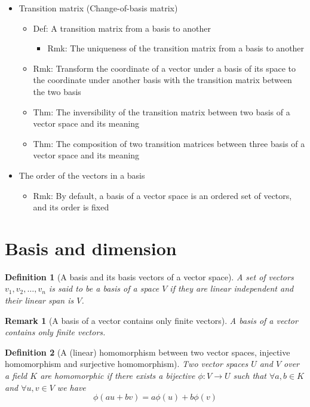 \documentclass[onecolumn]{ctexart}
\newtheorem{definition}{Definition}
\newtheorem{remark}{Remark}
\begin{document}
\begin{itemize}
\begin{itemize}
  \end{itemize}
  \item Transition matrix (Change-of-basis matrix)
  \begin{itemize}
    \item Def: A transition matrix from a basis to another
    \begin{itemize}
      \item Rmk: The uniqueness of the transition matrix from a basis to another
    \end{itemize}
    \item Rmk: Transform the coordinate of a vector under a basis of its space to the coordinate under another basis with the transition matrix between the two basis
    \item Thm: The inversibility of the transition matrix between two basis of a vector space and its meaning
    \item Thm: The composition of two transition matrices between three basis of a vector space and its meaning
  \end{itemize}
  \item The order of the vectors in a basis
  \begin{itemize}
    \item Rmk: By default, a basis of a vector space is an ordered set of vectors, and its order is fixed
  \end{itemize}
\end{itemize}

\section{Basis and dimension}

\begin{definition}[A basis and its basis vectors of a vector space]
  A set of vectors $v_1, v_2, \ldots, v_n$ is said to be a basis of a space $V$ if they are linear independent and their linear span is $V$.
\end{definition}

\begin{remark}[A basis of a vector contains only finite vectors]
  A basis of a vector contains only finite vectors.
\end{remark}

\begin{definition}[A (linear) homomorphism between two vector spaces, injective homomorphism and surjective homomorphism]
  Two vector spaces $U$ and $V$ over a field $K$ are homomorphic if there exists a bijective $\phi: V \to U$ such that $\forall a, b \in K$ and $\forall u, v \in V$ we have
  \begin{equation}
    \phi(au + bv) = a \phi(u) + b \phi(v)
  \end{equation}
\end{definition}
\end{document}
